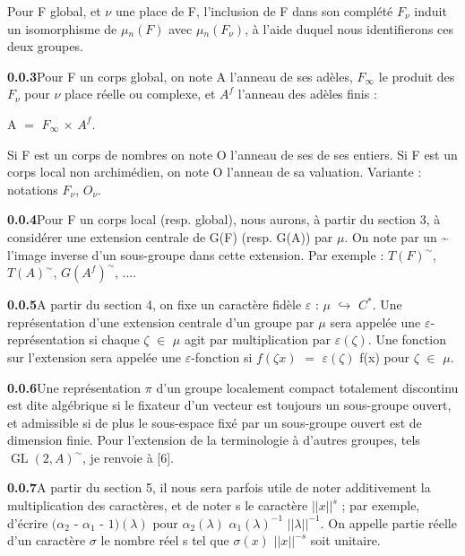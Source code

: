 \documentclass[10pt,a4paper]{article}
\begin{document}
\par Pour F global, et $\nu{}$ une place de F, l'inclusion de F dans son complété $F_\nu{}$ induit un isomorphisme de $\mu{}_n(F)$ avec $\mu{}_n(F_\nu{})$, à l'aide duquel nous identifierons ces deux groupes.\par
\par\noindent\textbf{0.0.3}\quad Pour F un corps global, on note A l'anneau de ses adèles, $F_\infty{}$ le produit des $F_\nu{}$ pour $\nu{}$ place réelle ou complexe, et $A^f$ l'anneau des adèles finis :\par
\par\smallskip\begin{center}\begin{minipage}{0.96\textwidth}\centering
A $=$ $F_\infty{}$ $\times{}$ $A^f$.
\end{minipage}\end{center}\smallskip
\par Si F est un corps de nombres on note O l'anneau de ses de ses entiers. Si F est un corps local non archimédien, on note O l'anneau de sa valuation. Variante : notations $F_\nu{}$, $O_\nu{}$.\par
\par\noindent\textbf{0.0.4}\quad Pour F un corps local (resp. global), nous aurons, à partir du section 3, à considérer une extension centrale de G(F) (resp. G(A)) par $\mu{}$. On note par un \textasciitilde{} l'image inverse d'un sous-groupe dans cette extension. Par exemple : $T(F)^\sim$, $T(A)^\sim$, $G(A^f)^\sim$, ....\par
\par\noindent\textbf{0.0.5}\quad A partir du section 4, on fixe un caractère fidèle $\varepsilon{}$ : $\mu{}$ $\hookrightarrow{}$ $C^*$. Une représentation d'une extension centrale d'un groupe par $\mu{}$ sera appelée une $\varepsilon{}$-représentation si chaque $\zeta{}$ $\in{}$ $\mu{}$ agit par multiplication par $\varepsilon{}(\zeta{})$. Une fonction sur l'extension sera appelée une $\varepsilon{}$-fonction si $f(\zeta{}x)$ $=$ $\varepsilon{}(\zeta{})$ f(x) pour $\zeta{}$ $\in{}$ $\mu{}$.\par
\par\noindent\textbf{0.0.6}\quad Une représentation $\pi{}$ d'un groupe localement compact totalement discontinu est dite algébrique si le fixateur d'un vecteur est toujours un sous-groupe ouvert, et admissible si de plus le sous-espace fixé par un sous-groupe ouvert est de dimension finie. Pour l'extension de la terminologie à d'autres groupes, tels $\operatorname{GL}(2,A)^\sim$, je renvoie à [6].\par
\par\noindent\textbf{0.0.7}\quad A partir du section 5, il nous sera parfois utile de noter additivement la multiplication des caractères, et de noter s le caractère $||x||^s$ ; par exemple, d'écrire $(\alpha{}_2$ - $\alpha{}_1$ - $1)(\lambda{})$ pour $\alpha{}_2(\lambda{})$ $\alpha{}_1(\lambda{})^{-1}$ $||\lambda{}||^{-1}$. On appelle partie réelle d'un caractère $\sigma{}$ le nombre réel s tel que $\sigma{}(x)$ $||x||^{-s}$ soit unitaire.\par
\end{document}
